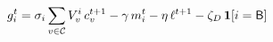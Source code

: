 
\color{ink}$\displaystyle
g_i^t=\sigma_i\sum_{v\in\mathcal{C}}V^i_v\,c^{t+1}_v-\gamma\,m^t_i-\eta\,\ell^{t+1}-\zeta_D\,\mathbf{1}[i=\mathsf{B}]
$
